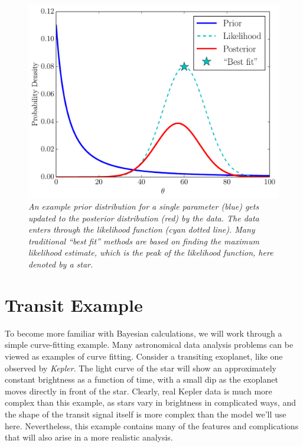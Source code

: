 \begin{figure}
\begin{center}
\includegraphics[scale=0.45]{bayes.pdf}
\caption{\it An example prior distribution for a single parameter (blue)
gets updated to the posterior distribution (red) by the data. The data
enters through the likelihood function (cyan dotted line). Many traditional
``best fit'' methods are based on finding the {\it maximum likelihood}
estimate, which is the peak of the likelihood function, here denoted by a
star.
\label{fig:bayes}}
\end{center}
\end{figure}

\section{Transit Example}
To become more familiar with Bayesian calculations, we will work through a
simple curve-fitting example. Many astronomical data analysis problems can be
viewed as examples of curve fitting.
Consider a transiting exoplanet, like
one observed by {\it Kepler}. The light curve of the star will show an
approximately constant brightness as a function of time, with a small dip as
the exoplanet moves directly in front of the star. Clearly, real Kepler data
is much more complex than this example, as stars vary in brightness in
complicated ways, and the shape of the transit signal itself is more complex
than the model we'll use here. Nevertheless, this example contains many of the
features and complications that will also arise in a more realistic analysis.

